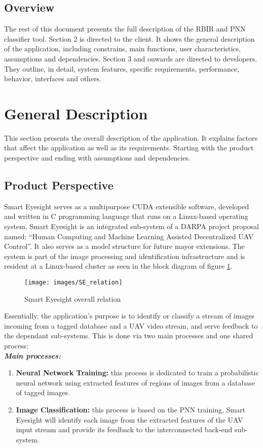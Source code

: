 \documentclass[12pt]{article}
\begin{document}
\subsection{Overview}
The rest of this document presents the full description of the RBIR
and PNN classifier tool. Section 2 is directed to the client. It shows
the general description of the application, including constrains, main
functions, user characteristics, assumptions and dependencies. Section
3 and onwards are directed to developers. They outline, in detail,
system features, specific requirements, performance, behavior,
interfaces and others.

\section{General Description}
This section presents the overall description of the application. It
explains factors that affect the application as well as its
requirements. Starting with the product perspective and ending with
assumptions and dependencies.

\subsection{Product Perspective}
Smart Eyesight serves as a multipurpose CUDA extensible software,
developed and written in C programming language that runs on a
Linux-based operating system. Smart Eyesight is an integrated
sub-system of a DARPA project proposal named: ``Human Computing and
Machine Learning Assisted Decentralized UAV Control''. It also serves
as a model structure for future mayor extensions. The system is part
of the image processing and identification infrastructure and is
resident at a Linux-based cluster as seen in the block diagram of
figure \ref{fig:SE-overall-relation}.

\begin{figure}[h]\centering
  \texttt{[image: images/SE\_relation]}
  \caption{Smart Eyesight overall relation}
  \label{fig:SE-overall-relation}
\end{figure}

Essentially, the application's purpose is to identify or classify a
stream of images incoming from a tagged database and a UAV video
stream, and serve feedback to the dependant sub-systems. This is done
via two main processes and one shared process:\\

\textbf{\textit{Main processes:}}
\begin{enumerate}
\item \textbf{Neural Network Training:} this process is dedicated to
  train a probabilistic neural network using extracted features of
  regions of images from a database of tagged images.
\item \textbf{Image Classification:} this process is based on the PNN
  training, Smart Eyesight will identify each image from the extracted
  features of the UAV input stream and provide its feedback to the
  interconnected back-end sub-system.
\end{enumerate}
\end{document}
